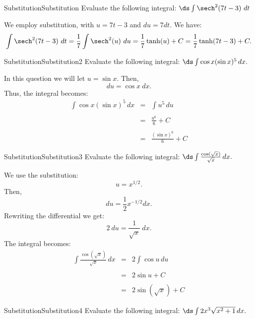 \begin{example}{Substitution}{Substitution}
Evaluate the following integral: $\ds\int \sech^2(7t-3)\ dt$
\end{example}

\begin{solution} 
 We employ substitution, with $u = 7t-3$ and $du = 7dt$. We have:
$$ \int \sech^2 (7t-3)\ dt=  \frac17 \int \sech^2 (u)\ du= \frac17\tanh (u) + C = \frac17\tanh (7t-3) + C.$$
\end{solution}





\begin{example}{Substitution}{Substitution2}
Evaluate the following integral: $\ds\int \cos x(\sin x)^5\,dx.$
\end{example}

\begin{solution} 
In this question we will let $u=\sin x$.
Then,
$$du=\cos x~dx.$$
Thus, the integral becomes:
\begin{eqnarray*}
\int \cos x(\sin x)^5\,dx&=&\int u^5\,du\\
\\
&=&\frac{u^6}{6}+C\\
\\
&=&\frac{(\sin x)^6}{6}+C
\end{eqnarray*}
\end{solution}

\begin{example}{Substitution}{Substitution3}
Evaluate the following integral:
$\ds\int \frac{\cos(\sqrt x)}{\sqrt x}\,dx.$
\end{example}

\begin{solution} 
We use the substitution:
$$u=x^{1/2}.$$
Then,
$$du=\frac{1}{2}x^{-1/2}dx.$$
Rewriting the differential we get:
$$2~du=\frac{1}{\sqrt x}~dx.$$
The integral becomes:
\begin{eqnarray*}
\int \frac{\cos(\sqrt x)}{\sqrt x}\,dx&=&2\int \cos u\,du\\
\\
&=&2\sin u+C\\
\\
&=&2\sin(\sqrt x)+C
\end{eqnarray*}
\end{solution}

\begin{example}{Substitution}{Substitution4}
Evaluate the following integral:
$\ds\int 2x^3\sqrt{x^2+1}\,dx.$
\end{example}

